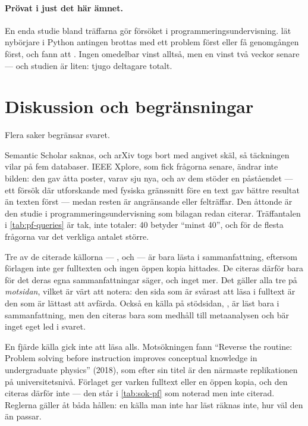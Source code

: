 \paragraph{Prövat i just det här ämnet.}  En enda studie bland
träffarna gör försöket i programmeringsundervisning.
\textcite{Suriyaarachchi2025} lät nybörjare i Python antingen brottas med
ett problem först eller få genomgången först, och fann att
.  Ingen omedelbar vinst alltså, men en vinst två veckor senare ---
och studien är liten: tjugo deltagare totalt.

\section{Diskussion och begränsningar}
\label{sec:pf-diskussion}

Flera saker begränsar svaret.

Semantic Scholar saknas, och arXiv togs bort med angivet skäl, så
täckningen vilar på fem databaser.  IEEE Xplore, som fick frågorna
senare, ändrar inte bilden: den gav åtta poster, varav sju nya, och av
dem stöder en påståendet --- ett försök där utforskande med fysiska
gränssnitt före en text gav bättre resultat än texten först --- medan
resten är angränsande eller felträffar.  Den åttonde är den studie i
programmeringsundervisning som bilagan redan citerar.  Träffantalen i
\cref{tab:pf-queries} är tak, inte totaler: 40 betyder \enquote{minst 40},
och för de flesta frågorna var det verkliga antalet större.

Tre av de citerade källorna --- \textcite{Ashman2020},
\textcite{Nachtigall2020} och \textcite{ChaseKlahr2017} --- är bara lästa i
sammanfattning, eftersom förlagen inte ger fulltexten och ingen öppen kopia
hittades.  De citeras därför bara för det deras egna sammanfattningar säger,
och inget mer.  Det gäller alla tre på \emph{motsidan}, vilket är värt att
notera: den sida som är svårast att läsa i fulltext är den som är lättast
att avfärda.  Också en källa på stödsidan,
\textcite{SchneiderBlikstein2016}, är läst bara i sammanfattning, men den
citeras bara som medhåll till metaanalysen och bär inget eget led i
svaret.

En fjärde källa gick inte att läsa alls.  Motsökningen fann
\enquote{Reverse the routine: Problem solving before instruction improves
conceptual knowledge in undergraduate physics} (2018), som efter sin titel
är den närmaste replikationen på universitetsnivå.  Förlaget ger varken
fulltext eller en öppen kopia, och den citeras därför inte --- den står i
\cref{tab:sok-pf} som noterad men inte citerad.  Reglerna gäller åt båda
hållen: en källa man inte har läst räknas inte, hur väl den än passar.

